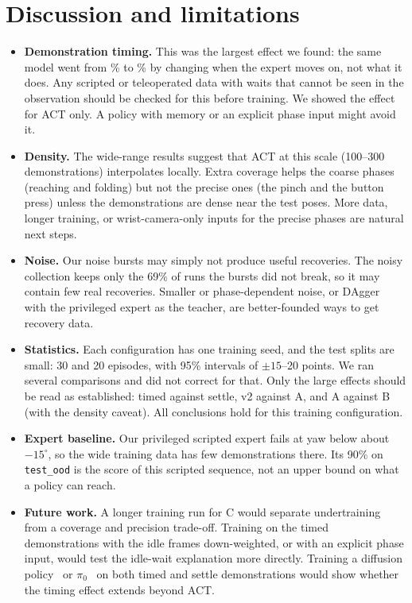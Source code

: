 \documentclass[10pt,twocolumn,letterpaper]{article}
\newcommand{\ttt}[1]{\texttt{\small #1}}
\begin{document}
\section{Discussion and limitations}
\begin{itemize}\itemsep0pt
  \item \textbf{Demonstration timing.} This was the largest effect we found: the same model went from \TimedId\%
  to \VtwoId\% by changing when the expert moves on, not what it does. Any scripted or teleoperated data with
  waits that cannot be seen in the observation should be checked for this before training. We showed the
  effect for ACT only. A policy with memory or an explicit phase input might avoid it.
  \item \textbf{Density.} The wide-range results suggest that ACT at this scale (100--300 demonstrations)
  interpolates locally. Extra coverage helps the coarse phases (reaching and folding) but not the precise ones
  (the pinch and the button press) unless the demonstrations are dense near the test poses. More data, longer
  training, or wrist-camera-only inputs for the precise phases are natural next steps.
  \item \textbf{Noise.} Our noise bursts may simply not produce useful recoveries. The noisy collection keeps
  only the 69\% of runs the bursts did not break, so it may contain few real recoveries. Smaller or
  phase-dependent noise, or DAgger~\cite{dagger} with the privileged expert as the teacher, are better-founded
  ways to get recovery data.
  \item \textbf{Statistics.} Each configuration has one training seed, and the test splits are small: 30 and 20
  episodes, with 95\% intervals of $\pm15$--20 points. We ran several comparisons and did not correct for
  that. Only the large effects should be read as established: timed against settle, v2 against A, and A
  against B (with the density caveat). All conclusions hold for this training configuration.
  \item \textbf{Expert baseline.} Our privileged scripted expert fails at yaw below about $-15^\circ$, so the
  wide training data has few demonstrations there. Its 90\% on \ttt{test\_ood} is the score of this scripted
  sequence, not an upper bound on what a policy can reach.
  \item \textbf{Future work.} A longer training run for C would separate undertraining from a coverage and
  precision trade-off. Training on the timed demonstrations with the idle frames down-weighted, or with an
  explicit phase input, would test the idle-wait explanation more directly. Training a diffusion
  policy~\cite{diffusion_policy} or $\pi_0$~\cite{pi0} on both timed and settle demonstrations would show
  whether the timing effect extends beyond ACT.
\end{itemize}
\end{document}
